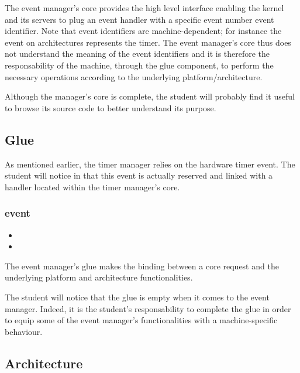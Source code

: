 The event manager's core provides the high level interface enabling the kernel
and its servers to plug an event handler with a specific event number \ie{}
event identifier. Note that event identifiers are machine-dependent; for
instance the event  on  architectures represents the
timer. The event manager's core thus does not understand the meaning of the
event identifiers and it is therefore the responsability of the machine,
through the glue component, to perform the necessary operations according
to the underlying platform/architecture.

Although the manager's core is complete, the student will probably find it
useful to browse its source code to better understand its purpose.

\subsection{Glue}

As mentioned earlier, the timer manager relies on the hardware timer event.
The student will notice in
 that this
event is actually reserved and linked with a handler located within the
timer manager's core.

\subsubsection*{event}

\begin{itemize}
  \item
  \item
\end{itemize}

The event manager's glue makes the binding between a core request and the
underlying platform and architecture functionalities.

The student will notice that the glue is empty when it comes to the
event manager. Indeed, it is the student's responsability to complete the
glue in order to equip some of the event manager's functionalities with a
machine-specific behaviour.

\subsection{Architecture}

